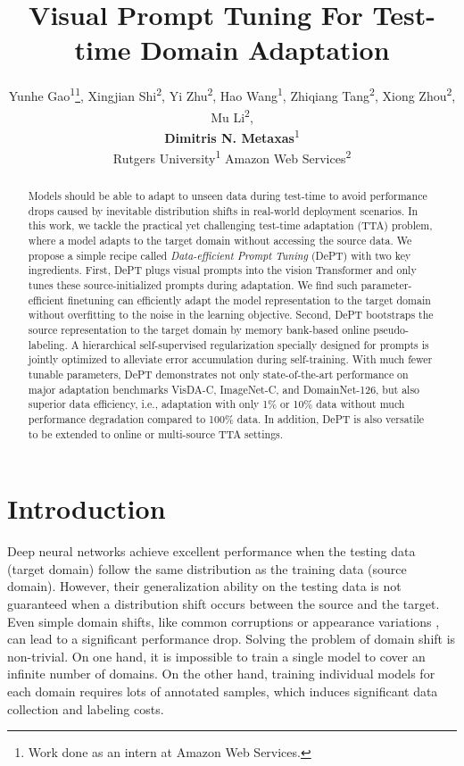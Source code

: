 \documentclass{article} \usepackage{iclr2023_conference,times}
\title{Visual Prompt Tuning For Test-time Domain Adaptation}
\author{Yunhe Gao\textsuperscript{1}\thanks{Work done as an intern at Amazon Web Services.}, Xingjian Shi\textsuperscript{2}, Yi Zhu\textsuperscript{2}, Hao Wang\textsuperscript{1}, Zhiqiang Tang\textsuperscript{2}, Xiong Zhou\textsuperscript{2}, Mu Li\textsuperscript{2}, \\ \textbf{Dimitris N. Metaxas}\textsuperscript{1} \\
Rutgers University\textsuperscript{1} \quad Amazon Web Services\textsuperscript{2}
}
\begin{document}
\maketitle

\begin{abstract}



Models should be able to adapt to unseen data during test-time to avoid performance drops caused by inevitable distribution shifts in real-world deployment scenarios. In this work, we tackle the practical yet challenging test-time adaptation (TTA) problem, where a model adapts to the target domain without accessing the source data. We propose a simple recipe called \textit{Data-efficient Prompt Tuning} (DePT) with two key ingredients. First, DePT plugs visual prompts into the vision Transformer and only tunes these source-initialized prompts during adaptation. We find such parameter-efficient finetuning can efficiently adapt the model representation to the target domain without overfitting to the noise in the learning objective. Second, DePT bootstraps the source representation to the target domain by memory bank-based online pseudo-labeling. A hierarchical self-supervised regularization specially designed for prompts is jointly optimized to alleviate error accumulation during self-training. With much fewer tunable parameters, DePT demonstrates not only state-of-the-art performance on major adaptation benchmarks VisDA-C, ImageNet-C, and DomainNet-126, but also superior data efficiency, i.e., adaptation with only 1\% or 10\% data without much performance degradation compared to 100\% data. In addition, DePT is also versatile to be extended to online or multi-source TTA settings.


\end{abstract}

\section{Introduction}





Deep neural networks achieve excellent performance when the testing data (target domain) follow the same distribution as the training data (source domain). However, their generalization ability on the testing data is not guaranteed when a distribution shift occurs between the source and the target. Even simple domain shifts, like common corruptions \citep{hendrycks2019benchmarking} or appearance variations \citep{geirhos2018imagenet}, can lead to a significant performance drop. Solving the problem of domain shift is non-trivial. On one hand, it is impossible to train a single model to cover an infinite number of domains. On the other hand, training individual models for each domain requires lots of annotated samples, which induces significant data collection and labeling costs.
\end{document}
